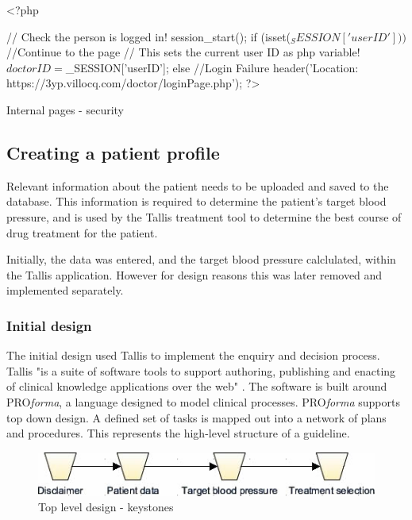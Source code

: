 \documentclass[11pt]{article}
\begin{document}
\begin{code}[ht]
\begin{php}
<?php

// Check the person is logged in!
session_start();    
if (isset($_SESSION['userID'])) $
{
    //Continue to the page
    // This sets the current user ID as php variable!
    $doctorID = $_SESSION['userID'];
}
else
{
    //Login Failure
header('Location: https://3yp.villocq.com/doctor/loginPage.php'); 
}
?>
\end{php}
\caption{Internal pages - security}
\label{code:intPages}
\end{code}


\subsection{Creating a patient profile}

Relevant information about the patient needs to be uploaded and saved to the database. This information is required to determine the patient's target blood pressure, and is used by the Tallis treatment tool to determine the best course of drug treatment for the patient.

Initially, the data was entered, and the target blood pressure calclulated, within the Tallis application. However for design reasons this was later removed and implemented separately.

\subsubsection{Initial design}

The initial design used Tallis to implement the enquiry and decision process. Tallis "is a suite of software tools to support authoring, publishing and enacting of clinical knowledge applications over the web" \cite{tallisDescription}. The software is built around PRO\textit{forma}, a language designed to model clinical processes. PRO\textit{forma} supports top down design. A defined set of tasks is mapped out into a network of plans and procedures. This represents the high-level structure of a guideline. 

\begin{figure}[ht]
\begin{center}
\includegraphics[scale=0.8]{tallis_keystone_top}
\caption{Top level design - keystones}
\label{fig:tallis_keystone_top}
\end{center}
\end{figure}
\end{document}
